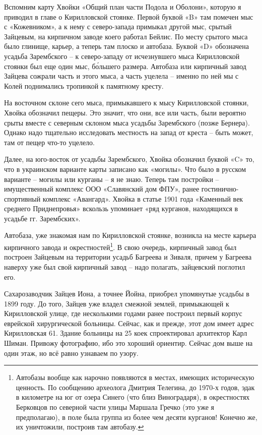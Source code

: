 Вспомним карту Хвойки «Общий план части Подола и Оболони», которую я приводил в главе о Кирилловской стоянке. Первой буквой «B» там помечен мыс с «Кожевником», а к нему с северо-запада примыкал другой мыс, срытый Зайцевым, на кирпичном заводе коего работал Бейлис. По месту срытого мыса было глинище, карьер, а теперь там плоско и автобаза. Буквой «D» обозначена усадьба Зарембского – к северо-западу от исчезнувшего мыса Кирилловской стоянки был еще один мыс, б\'ольшего размера. Автобаза или кирпичный завод Зайцева сожрали часть и этого мыса, а часть уцелела – именно по ней мы с Колей поднимались тропинкой к памятному кресту.

На восточном склоне сего мыса, примыкавшего к мысу Кирилловской стоянки, Хвойка обозначил пещеры. Это значит, что они, все или часть, были вероятно срыты вместе с северным склоном мыса усадьбы Зарембского (позже Бернера). Однако надо тщательно исследовать местность на запад от креста – быть может, там от пещер что-то уцелело.

Далее, на юго-восток от усадьбы Зарембского, Хвойка обозначил буквой «C» то, что в украинском варианте карты записано как «могилы». Что было в русском варианте – могилы или курганы – я не знаю. Теперь там постройки – имущественный комплекс ООО «Славянский дом ФПУ», ранее гостинично-спортивный комплекс «Авангард». Хвойка в статье 1901 года «Каменный век среднего Приднепровья» вскользь упоминает «ряд курганов, находящихся в усадьбе гг. Зарембских».

Автобаза, уже знакомая нам по Кирилловской стоянке, возникла на месте карьера кирпичного завода и окрестностей\footnote{Автобазы вообще как нарочно появляются в местах, имеющих историческую ценность. По сообщению археолога Дмитрия Телегина\cite{telegin01}, до 1970-х годов, эдак в километре на юг от озера Синего (что близ Виноградаря), в окрестностях Берковцов по северной части улицы Маршала Гречко (это уже я предполагаю), в поле была группа из более чем десяти курганов! Конечно же, их уничтожили, построив там автобазу.}. В свою очередь, кирпичный завод был построен Зайцевым на территории усадьб Багреева и Зиваля, причем у Багреева наверху уже был свой кирпичный завод – надо полагать, зайцевский поглотил его.

Сахарозаводчик Зайцев Иона, а точнее Йойна, приобрел упомянутые усадьбы в 1899 году. До того, Зайцев уже владел смежной землей, примыкающей к Кирилловской улице, где несколькими годами ранее построил первый корпус еврейской хирургической больницы. Сейчас, как и прежде, этот дом имеет адрес Кирилловская 61. Здание больницы на 25 коек спроектировал архитектор Карл Шиман. Привожу фотографию, ибо это хороший ориентир. Сейчас дом выше на один этаж, но всё равно узнаваем по узору.

